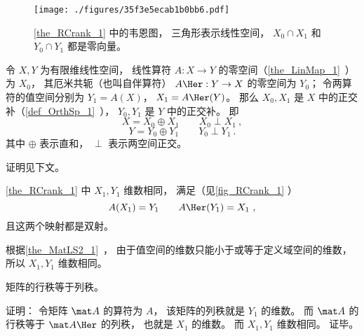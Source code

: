 

\begin{figure}[ht]
\centering
\texttt{[image: ./figures/35f3e5ecab1b0bb6.pdf]}
\caption{\autoref{the_RCrank_1} 中的韦恩图， 三角形表示线性空间， $X_0\cap X_1$ 和 $Y_0\cap  Y_1$ 都是零向量。} \label{fig_RCrank_1}
\end{figure}

\begin{theorem}{}\label{the_RCrank_1}
令 $X, Y$ 为有限维线性空间， 线性算符 $A:X \to Y$ 的零空间（\autoref{the_LinMap_1}~）为 $X_0$， 其厄米共轭（也叫自伴算符） $A\Her: Y \to X$ 的零空间为 $Y_0$； 令两算符的值空间分别为 $Y_1 = A(X)$， $X_1 = A\Her(Y)$。 那么 $X_0, X_1$ 是 $X$ 中的正交补（\autoref{def_OrthSp_1}~）， $Y_0, Y_1$ 是 $Y$ 中的正交补。 即
\begin{equation}
X = X_0 \oplus X_1 \qquad X_0 \perp X_1~,
\end{equation}
\begin{equation}
Y = Y_0 \oplus Y_1 \qquad Y_0 \perp Y_1~.
\end{equation}
其中 $\oplus$ 表示直和， $\perp$ 表示两空间正交。
\end{theorem}
证明见下文。

\begin{corollary}{}
\autoref{the_RCrank_1} 中 $X_1, Y_1$ 维数相同， 满足（见\autoref{fig_RCrank_1} ）
\begin{equation}\label{eq_RCrank_3}
A(X_1) = Y_1 \qquad A\Her (Y_1) = X_1~,
\end{equation}
且这两个映射都是双射。
\end{corollary}
根据\autoref{the_MatLS2_1}~， 
由于值空间的维数只能小于或等于定义域空间的维数， 所以 $X_1, Y_1$ 维数相同。

\begin{corollary}{}\label{cor_RCrank_1}
矩阵的行秩等于列秩。
\end{corollary}
证明： 令矩阵 $\mat A$ 的算符为 $A$， 该矩阵的列秩就是 $Y_1$ 的维数。 而 $\mat A$ 的行秩等于 $\mat A\Her$ 的列秩， 也就是 $X_1$ 的维数。 而 $X_1, Y_1$ 维数相同。 证毕。

